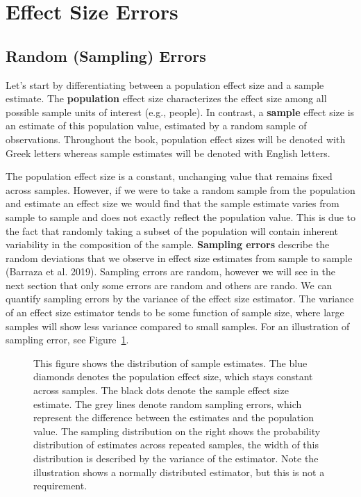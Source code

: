 \documentclass[
  letterpaper,
  DIV=11,
  numbers=noendperiod]{scrreprt}
\begin{document}
\section{Effect Size Errors}\label{effect-size-errors}

\subsection{Random (Sampling) Errors}\label{random-sampling-errors}

Let's start by differentiating between a population effect size and a
sample estimate. The \textbf{population} effect size characterizes the
effect size among all possible sample units of interest (e.g., people).
In contrast, a \textbf{sample} effect size is an estimate of this
population value, estimated by a random sample of observations.
Throughout the book, population effect sizes will be denoted with Greek
letters whereas sample estimates will be denoted with English letters.

The population effect size is a constant, unchanging value that remains
fixed across samples. However, if we were to take a random sample from
the population and estimate an effect size we would find that the sample
estimate varies from sample to sample and does not exactly reflect the
population value. This is due to the fact that randomly taking a subset
of the population will contain inherent variability in the composition
of the sample. \textbf{Sampling errors} describe the random deviations
that we observe in effect size estimates from sample to sample (Barraza
et al. 2019). Sampling errors are random, however we will see in the
next section that only some errors are random and others are rando. We
can quantify sampling errors by the variance of the effect size
estimator. The variance of an effect size estimator tends to be some
function of sample size, where large samples will show less variance
compared to small samples. For an illustration of sampling error, see
Figure~\ref{fig-3.1}.

\begin{figure}[H]


\caption{\label{fig-3.1}This figure shows the distribution of sample
estimates. The blue diamonds denotes the population effect size, which
stays constant across samples. The black dots denote the sample effect
size estimate. The grey lines denote random sampling errors, which
represent the difference between the estimates and the population value.
The sampling distribution on the right shows the probability
distribution of estimates across repeated samples, the width of this
distribution is described by the variance of the estimator. Note the
illustration shows a normally distributed estimator, but this is not a
requirement.}

\end{figure}%
\end{document}
